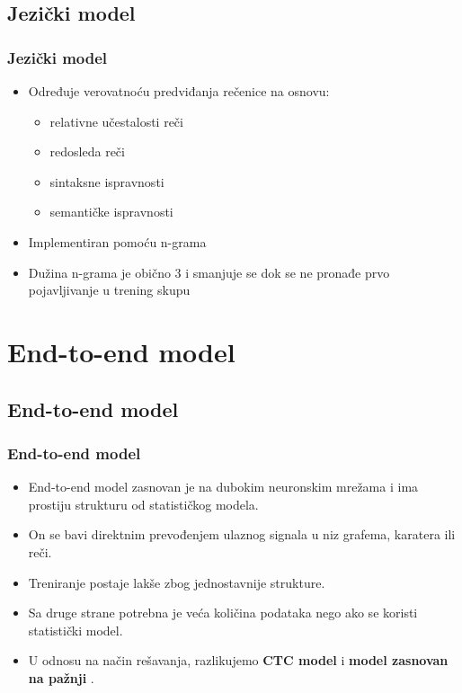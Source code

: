 \documentclass{beamer}
\begin{document}
\subsection{Jezički model}
\begin{frame}
  \frametitle{Jezički model}

  \begin{itemize}
    \item Određuje verovatnoću predviđanja rečenice na osnovu:
    \begin{itemize}
      \item relativne učestalosti reči
      \item redosleda reči
      \item sintaksne ispravnosti
      \item semantičke ispravnosti
    \end{itemize}
    \item Implementiran pomoću n-grama
    \item Dužina n-grama je obično 3 i smanjuje se dok se ne pronađe prvo pojavljivanje u trening skupu
  \end{itemize}
\end{frame}

\section{End-to-end model}
\subsection{End-to-end model}
\begin{frame}
  \frametitle{End-to-end model}
  \begin{itemize}
      \item End-to-end model zasnovan je na dubokim neuronskim mrežama i ima
prostiju strukturu od statističkog modela.
    \item On se bavi direktnim prevođenjem ulaznog signala u niz grafema, karatera ili reči.
    \item Treniranje postaje lakše zbog jednostavnije strukture.
    \item Sa druge strane potrebna je veća količina podataka nego ako se koristi statistički model.
    \item U odnosu na način rešavanja, razlikujemo \textbf{CTC model} \cite{graves2006ctc} i \textbf{model zasnovan na pažnji} \cite{chan2015las}. 
  \end{itemize} 
\end{frame}
\end{document}
